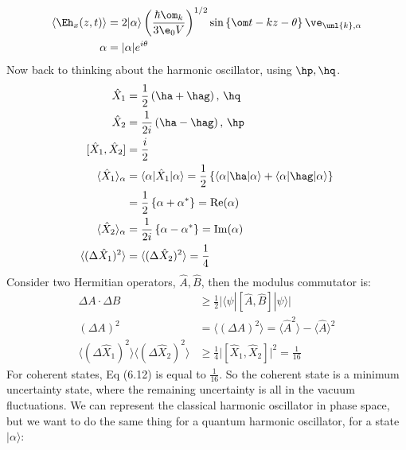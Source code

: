 \documentclass[a4paper, 11pt, normalem]{report}
\newcommand\xo{\hat{X}_1}
\newcommand\xt{\hat{X}_2}
\begin{document}
\chapter{}
\begin{align}
    \langle\Eh_x(z,t)\rangle &= 2|\alpha\rangle\left(\frac{\hbar\om_k}{3\e_0V}\right)^{1/2}\sin\left\{\om t - kz - \theta\right\}\ve_{\unl{k},\alpha} \\ 
    \alpha &= |\alpha|e^{i\theta} 
\end{align}
Now back to thinking about the harmonic oscillator, using $\hp,\hq$.
\begin{align}
    \hat{X}_1 &= \frac12\left(\ha+\hag\right),\, \hq \\
    \hat{X}_2 &= \frac{1}{2i}\left(\ha-\hag\right),\, \hp \\
    [\hat{X}_1,\hat{X}_2] &= \frac{i}{2} \\
    \langle\xo\rangle_\alpha &= \langle\alpha|\xo|\alpha\rangle = \frac12 \left\{\langle\alpha|\ha|\alpha\rangle + \langle\alpha|\hag|\alpha\rangle\right\} \\ 
                             &= \frac12 \left\{\alpha+\alpha^*\right\} = \text{Re}(\alpha) \\
    \langle\xt\rangle_\alpha &= \frac{1}{2i}\left\{\alpha-\alpha^*\right\} = \text{Im}(\alpha) \\
    \langle(\Delta\xo)^2\rangle &= \langle(\Delta\xt)^2\rangle = \frac14
\end{align}
Consider two Hermitian operators, $\hat{A},\hat{B}$, then the modulus commutator is:
\begin{align}
    \Delta A\cdot\Delta B &\geq \frac12\Big|\langle\psi|[\hat{A},\hat{B}]|\psi\rangle\Big| \\
    (\Delta A)^2 &= \langle(\Delta A)^2\rangle = \langle\hat{A}^2\rangle - \langle\hat{A}\rangle^2\\
    \langle(\Delta\xo)^2\rangle\langle(\Delta\xt)^2\rangle &\geq \frac14\Big|[\xo,\xt]\Big|^2 = \frac{1}{16}
\end{align}
For coherent states, Eq (6.12) is equal to $\frac{1}{16}$. 
So the coherent state is a minimum uncertainty state, where the remaining uncertainty is all in the vacuum fluctuations.
We can represent the classical harmonic oscillator in phase space, but we want to do the same thing for a quantum harmonic oscillator, for a state $|\alpha\rangle$:
\end{document}
